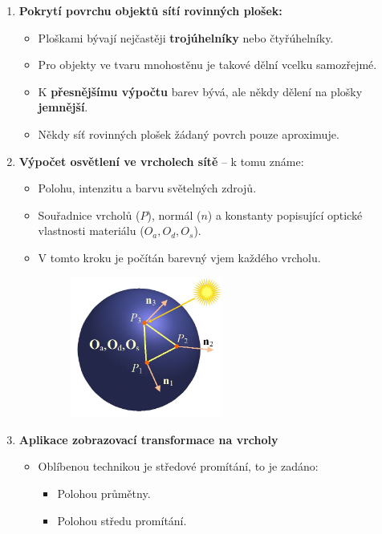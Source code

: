 \begin{enumerate}
	\item  \textbf{Pokrytí povrchu objektů sítí rovinných plošek:}
	\begin{itemize}
		\item Ploškami bývají nejčastěji \textbf{trojúhelníky} nebo čtyřúhelníky.
		\item Pro objekty ve tvaru mnohostěnu je takové dělní vcelku samozřejmé.
		\item K \textbf{přesnějšímu výpočtu }barev bývá, ale někdy dělení na plošky \textbf{jemnější}.
		\item Někdy síť rovinných plošek žádaný povrch pouze aproximuje.
	\end{itemize}
	\item \textbf{Výpočet osvětlení ve vrcholech sítě} -- k tomu známe:
	\begin{itemize}
		\item Polohu, intenzitu a barvu světelných zdrojů.
		\item Souřadnice vrcholů ($P$), normál ($n$) a konstanty popisující optické vlastnosti materiálu ($O_a, O_d, O_s$).
		\item V tomto kroku je počítán barevný vjem každého vrcholu.
		\begin{figure}[H]
		\centering
		\includegraphics[width=0.5\textwidth]{assets/5_vypocet_barevneho_vjemu}
		\end{figure}
	\end{itemize}
	\item \textbf{Aplikace zobrazovací transformace na vrcholy}
	\begin{itemize}
		\item Oblíbenou technikou je středové promítání, to je zadáno:
		\begin{itemize}
			\item Polohou průmětny.
			\item Polohou středu promítání.
		\end{itemize}

\end{itemize}
\end{enumerate}
